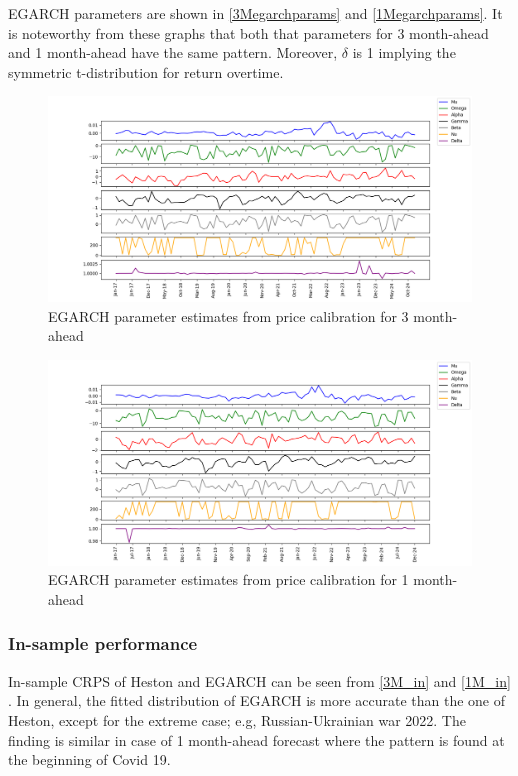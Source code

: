 \documentclass[12pt,a4paper]{article}
\newcommand\colorAutoref[1]{{\hypersetup{linkcolor=black}\autoref{#1}}}
\numberwithin{equation}{section}
\begin{document}
EGARCH parameters are shown in \colorAutoref{3Megarchparams} and  \colorAutoref{1Megarchparams}. It is noteworthy from these graphs that both that parameters for 3 month-ahead and 1 month-ahead have the same pattern. Moreover, $\delta$ is 1 implying the symmetric t-distribution for return overtime. 

\begin{figure}[h!] 
\includegraphics[scale=1,width=1\linewidth,height=0.4\textheight]{egarch_params_3m.png}
\caption{EGARCH parameter estimates from price calibration for 3 month-ahead}
\label{3Megarchparams}
\end{figure}

\begin{figure}[h!] 
\includegraphics[scale=1,width=1\linewidth,height=0.4\textheight]{egarch_params_1m.png}
\caption{EGARCH parameter estimates from price calibration for 1 month-ahead}
\label{1Megarchparams}
\end{figure}

\subsubsection{In-sample performance}


In-sample CRPS of Heston and EGARCH can be seen from \colorAutoref{3M_in} and \colorAutoref{1M_in} . In general, the fitted distribution of EGARCH is more accurate than the one of Heston, except for the extreme case; e.g, Russian-Ukrainian war 2022. The finding is similar in case of 1 month-ahead forecast where the pattern is found at the beginning of Covid 19. 
\end{document}
